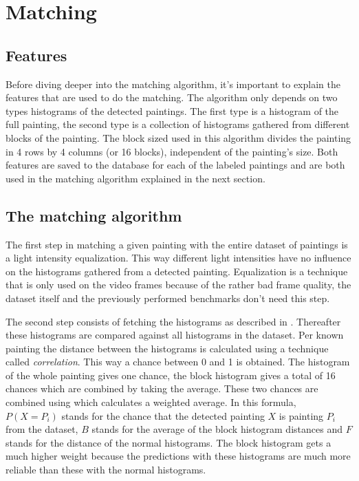 \section{Matching}
\label{sec:matching}

\subsection{Features}
\label{subsec:the-features}

Before diving deeper into the matching algorithm, it's important to explain the features that are used to do the matching. The algorithm only depends on two types histograms of the detected paintings. The first type is a histogram of the full painting, the second type is a collection of histograms gathered from different blocks of the painting. The block sized used in this algorithm divides the painting in 4 rows by 4 columns (or 16 blocks), independent of the painting's size. Both features are saved to the database for each of the labeled paintings and are both used in the matching algorithm explained in the next section.

\subsection{The matching algorithm}
\label{subsec:matching-algo}

The first step in matching a given painting with the entire dataset of paintings is a light intensity equalization. This way different light intensities have no influence on the histograms gathered from a detected painting. Equalization is a technique that is only used on the video frames because of the rather bad frame quality, the dataset itself and the previously performed benchmarks don't need this step. \cite{patel2013comparative}

The second step consists of fetching the histograms as described in . Thereafter these histograms are compared against all histograms in the dataset. Per known painting the distance between the histograms is calculated using a technique called \emph{correlation}. This way a chance between 0 and 1 is obtained. The histogram of the whole painting gives one chance, the block histogram gives a total of 16 chances which are combined by taking the average. These two chances are combined using  which calculates a weighted average. In this formula, $P(X = P_{i})$ stands for the chance that the detected painting $X$ is painting $P_{i}$ from the dataset, $B$ stands for the average of the block histogram distances and $F$ stands for the distance of the normal histograms. The block histogram gets a much higher weight because the predictions with these histograms are much more reliable than these with the normal histograms.

